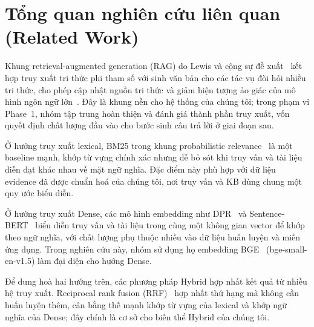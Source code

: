 
\section{Tổng quan nghiên cứu liên quan (Related Work)}
\label{sec:relatedwork}

Khung retrieval-augmented generation (RAG) do Lewis và cộng sự đề xuất~\cite{lewis2020rag} kết hợp truy xuất tri thức phi tham số với sinh văn bản cho các tác vụ đòi hỏi nhiều tri thức, cho phép cập nhật nguồn tri thức và giảm hiện tượng ảo giác của mô hình ngôn ngữ lớn~\cite{ji2023hallucination}. Đây là khung nền cho hệ thống của chúng tôi; trong phạm vi Phase~1, nhóm tập trung hoàn thiện và đánh giá thành phần truy xuất, vốn quyết định chất lượng đầu vào cho bước sinh câu trả lời ở giai đoạn sau.

Ở hướng truy xuất lexical, BM25 trong khung probabilistic relevance~\cite{robertson2009bm25} là một baseline mạnh, khớp từ vựng chính xác nhưng dễ bỏ sót khi truy vấn và tài liệu diễn đạt khác nhau về mặt ngữ nghĩa. Đặc điểm này phù hợp với dữ liệu evidence đã được chuẩn hoá của chúng tôi, nơi truy vấn và KB dùng chung một quy ước biểu diễn.

Ở hướng truy xuất Dense, các mô hình embedding như DPR~\cite{karpukhin2020dpr} và Sentence-BERT~\cite{reimers2019sbert} biểu diễn truy vấn và tài liệu trong cùng một không gian vector để khớp theo ngữ nghĩa, với chất lượng phụ thuộc nhiều vào dữ liệu huấn luyện và miền ứng dụng. Trong nghiên cứu này, nhóm sử dụng họ embedding BGE~\cite{xiao2024cpack} (bge-small-en-v1.5) làm đại diện cho hướng Dense.

Để dung hoà hai hướng trên, các phương pháp Hybrid hợp nhất kết quả từ nhiều hệ truy xuất. Reciprocal rank fusion (RRF)~\cite{cormack2009rrf} hợp nhất thứ hạng mà không cần huấn luyện thêm, cân bằng thế mạnh khớp từ vựng của lexical và khớp ngữ nghĩa của Dense; đây chính là cơ sở cho biến thể Hybrid của chúng tôi.

